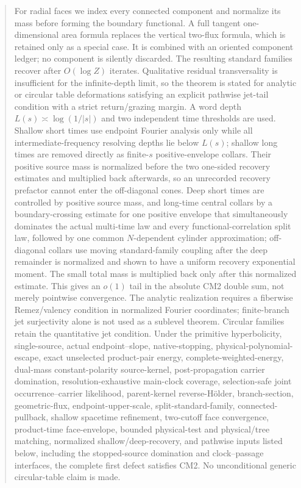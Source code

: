 \documentclass[11pt]{article}
\begin{document}
\begin{abstract}
For radial faces we index every connected component and normalize its mass
before forming the boundary functional.  A full tangent one-dimensional area
formula replaces the vertical two-flux formula, which is retained only as a
special case.  It is combined with an oriented component ledger; no component is silently
discarded.  The resulting standard families recover after $O(\log Z)$
iterates.  Qualitative residual transversality is insufficient for the
infinite-depth limit, so the theorem is stated for analytic or circular table
deformations satisfying an explicit pathwise jet-tail condition with a
strict return/grazing margin.  A word depth $L(s)\asymp\log(1/|s|)$ and two
independent time thresholds are used.  Shallow short times use endpoint
Fourier analysis only while all intermediate-frequency resolving depths lie
below $L(s)$; shallow long times are removed directly as finite-$s$
positive-envelope collars.  Their positive source mass is normalized before
the two one-sided recovery estimates and multiplied back afterwards, so an
unrecorded recovery prefactor cannot enter the off-diagonal cones.
Deep short times are controlled by positive source mass, and long-time
central collars by a boundary-crossing estimate for
one positive envelope that simultaneously dominates the actual multi-time law
and every functional-correlation split law, followed by one common
$N$-dependent cylinder approximation;
off-diagonal collars use moving standard-family coupling after the deep
remainder is normalized and shown to have a uniform recovery exponential
moment.  The small total mass is multiplied back only after this normalized
estimate.  This gives an
$o(1)$ tail in the absolute CM2 double sum, not merely pointwise convergence.
The analytic realization requires a fiberwise Remez/valency condition in
normalized Fourier coordinates; finite-branch jet surjectivity alone is not
used as a sublevel theorem.  Circular families retain the quantitative jet
condition.  Under the primitive hyperbolicity, single-source, actual
endpoint--slope, native-stopping, physical-polynomial-escape, exact
unselected product-pair energy, complete-weighted-energy, dual-mass
constant-polarity source-kernel, post-propagation carrier domination,
resolution-exhaustive main-clock
coverage, selection-safe joint occurrence--carrier likelihood,
parent-kernel reverse-H\"older, branch-section,
geometric-flux, endpoint-upper-scale, split-standard-family,
connected-pullback, shallow spacetime refinement, two-cutoff face convergence,
product-time face-envelope, bounded physical-test and physical/tree
matching, normalized shallow/deep-recovery, and pathwise inputs
listed below, including the stopped-source domination and clock--passage
interfaces, the complete first
defect satisfies CM2.  No unconditional generic circular-table claim is made.

\end{abstract}
\end{document}
